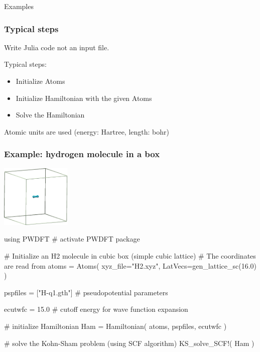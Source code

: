 \begin{frame}[plain]
\begin{center}
\Huge{Examples}
\end{center}
\end{frame}

\begin{frame}
\frametitle{Typical steps}

Write Julia code not an input file.

Typical steps:
\begin{itemize}
\item Initialize Atoms
\item Initialize Hamiltonian with the given Atoms
\item Solve the Hamiltonian
\end{itemize}

Atomic units are used (energy: Hartree, length: bohr)

\end{frame}


\begin{frame}[fragile]
\frametitle{Example: hydrogen molecule in a box}

{\centering
\includegraphics[width=0.25\textwidth]{codes/H2/H2.png}

}

\begin{juliacode}
using PWDFT # activate PWDFT package

# Initialize an H2 molecule in cubic box (simple cubic lattice)
# The coordinates are read from
atoms = Atoms( xyz_file="H2.xyz",
               LatVecs=gen_lattice_sc(16.0) )

pspfiles = ["H-q1.gth"] # pseudopotential parameters

ecutwfc = 15.0 # cutoff energy for wave function expansion

# initialize Hamiltonian
Ham = Hamiltonian( atoms, pspfiles, ecutwfc )

# solve the Kohn-Sham problem (using SCF algorithm)
KS_solve_SCF!( Ham )
\end{juliacode}


\end{frame}


